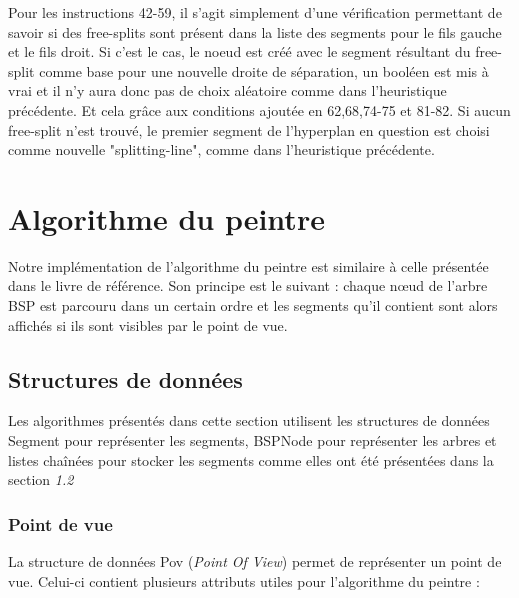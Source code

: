 \documentclass[11pt,a4paper]{article}
\theoremstyle{definition}
\theoremstyle{remark}
\begin{document}
Pour les instructions 42-59, il s'agit simplement d'une vérification permettant de savoir si des free-splits sont présent dans la liste des segments pour le fils gauche et le fils droit. Si c'est le cas, le noeud est créé avec le segment résultant du free-split comme base pour une nouvelle droite de séparation, un booléen est mis à vrai et il n'y aura donc pas de choix aléatoire comme dans l'heuristique précédente. Et cela grâce aux conditions ajoutée en 62,68,74-75 et 81-82. Si aucun free-split n'est trouvé, le premier segment de l'hyperplan en question est choisi comme nouvelle "splitting-line", comme dans l'heuristique précédente. 

\newpage

\section{Algorithme du peintre}

Notre implémentation de l'algorithme du peintre est similaire à celle présentée dans le livre de référence. Son principe est le suivant : chaque nœud de l'arbre BSP est parcouru dans un certain ordre et les segments qu'il contient sont alors affichés si ils sont visibles par le point de vue.

\subsection{Structures de données}
Les algorithmes présentés dans cette section utilisent les structures de données Segment pour représenter les segments, BSPNode pour représenter les arbres et listes chaînées pour stocker les segments comme elles ont été présentées dans la section \textit{1.2}

\subsubsection{Point de vue}
La structure de données Pov (\emph{Point Of View}) permet de représenter un point de vue. Celui-ci contient plusieurs attributs utiles pour l'algorithme du peintre :\\
\end{document}
